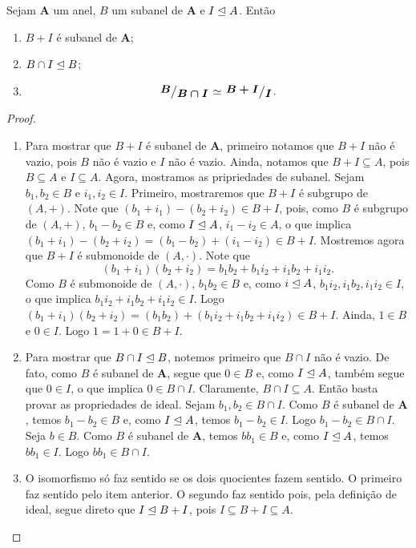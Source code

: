 \begin{teo}
	Sejam $\bm A$ um anel, $B$ um subanel de $\bm A$ e $I \mathrel{\unlhd} A$. Então
	\begin{enumerate}
	\item $B+I$ é subanel de $\bm A$;
	\item $B \cap I \mathrel{\unlhd} B$;
	\item
	\begin{equation*}
	\bm{\quo{B}{B \cap I}} \simeq \bm{\quo{B+I}{I}}.
	\end{equation*}
	\end{enumerate}
\end{teo}
\begin{proof}
	\begin{enumerate}
	\item Para mostrar que $B+I$ é subanel de $\bm A$, primeiro notamos que $B+I$ não é vazio, pois $B$ não é vazio e $I$ não é vazio. Ainda, notamos que $B+I \subseteq A$, pois $B \subseteq A$ e $I \subseteq A$. Agora, mostramos as pripriedades de subanel. Sejam $b_1,b_2 \in B$ e $i_1,i_2 \in I$. Primeiro, mostraremos que $B+I$ é subgrupo de $(A,+)$. Note que $(b_1+i_1)-(b_2+i_2) \in B+I$, pois, como $B$ é subgrupo de $(A,+)$, $b_1-b_2 \in B$ e, como $I \mathrel{\unlhd} A$, $i_1-i_2 \in A$, o que implica $(b_1+i_1)-(b_2+i_2) = (b_1-b_2)+(i_1-i_2) \in B+I$. Mostremos agora que $B+I$ é submonoide de $(A,\cdot)$. Note que
	\begin{equation*}
	(b_1+i_1)(b_2+i_2)=b_1b_2+b_1i_2+i_1b_2+i_1i_2.
	\end{equation*}
Como $B$ é submonoide de $(A,\cdot)$, $b_1b_2 \in B$ e, como $i \mathrel{\unlhd} A$, $b_1i_2,i_1b_2,i_1i_2 \in I$, o que implica $b_1i_2+i_1b_2+i_1i_2 \in I$. Logo $(b_1+i_1)(b_2+i_2)=(b_1b_2)+(b_1i_2+i_1b_2+i_1i_2) \in B+I$. Ainda, $1 \in B$ e $0 \in I$. Logo $1=1+0 \in B+I$.
	\item Para mostrar que $B \cap I \mathrel{\unlhd} B$, notemos primeiro que $B \cap I$ não é vazio. De fato, como $B$ é subanel de $\bm A$, segue que $0 \in B$ e, como $I \mathrel{\unlhd} A$, também segue que $0 \in I$, o que implica $0 \in B \cap I$. Claramente, $B \cap I \subseteq A$. Então basta provar as propriedades de ideal. Sejam $b_1,b_2 \in B \cap I$. Como $B$ é subanel de $\bm A$, temos $b_1-b_2 \in B$ e, como $I \mathrel{\unlhd} A$, temos $b_1-b_2 \in I$. Logo $b_1-b_2 \in B \cap I$. Seja $b \in B$. Como $B$ é subanel de $\bm A$, temos $bb_1 \in B$ e, como $I \mathrel{\unlhd} A$, temos $bb_1 \in I$. Logo $bb_1 \in B \cap I$.
	\item O isomorfismo só faz sentido se os dois quocientes fazem sentido. O primeiro faz sentido pelo item anterior. O segundo faz sentido pois, pela definição de ideal, segue direto que $I \mathrel{\unlhd} B+I$, pois $I \subseteq B+I \subseteq A$.

\end{enumerate}
\end{proof}

